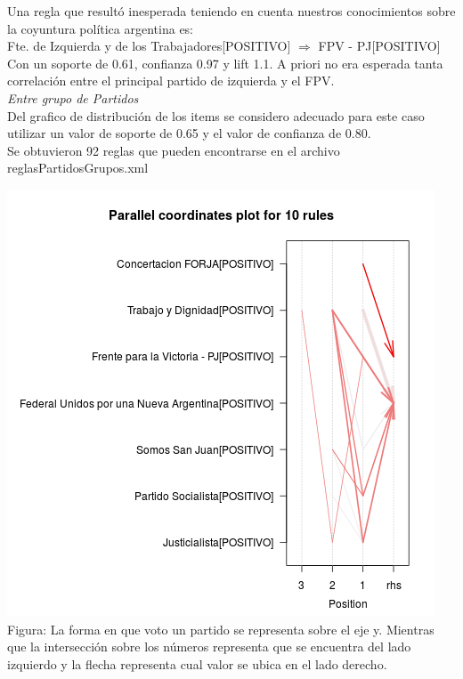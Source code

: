 \documentclass{endm}
\begin{document}
Una regla que resultó inesperada teniendo en cuenta nuestros conocimientos sobre la coyuntura política argentina es: \\

{Fte. de Izquierda y de los Trabajadores[POSITIVO]} $\Longrightarrow$ {FPV - PJ[POSITIVO]}\\

Con un soporte de 0.61, confianza 0.97 y lift 1.1. A priori no era esperada tanta correlación entre el principal partido de izquierda y el FPV. \\

\textit{Entre grupo de Partidos} \\

Del grafico de distribución de los items se considero adecuado para este caso utilizar un valor de soporte de 0.65 y el valor de confianza de 0.80. \\

Se obtuvieron 92 reglas que pueden encontrarse en el archivo reglasPartidosGrupos.xml \\

\begin{center}
\includegraphics[scale=0.5]{graficos/paracoordPartidosGrupos.png} \\
\scriptsize{Figura: La forma en que voto un partido se representa sobre el eje y. Mientras que la intersección sobre  los números representa que se encuentra del lado izquierdo y la flecha representa cual valor se ubica en el lado derecho.} \\
\end{center} 
\end{document}
